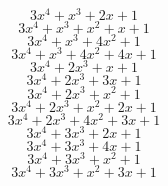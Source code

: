 \documentclass{article}
\begin{document}
\begin{dmath*}
3 x^{4}+x^{3}+2 x +1
\end{dmath*}
\vspace{-\bigskipamount}
\begin{dmath*}
3 x^{4}+x^{3}+x^{2}+x +1
\end{dmath*}
\vspace{-\bigskipamount}
\begin{dmath*}
3 x^{4}+x^{3}+4 x^{2}+1
\end{dmath*}
\vspace{-\bigskipamount}
\begin{dmath*}
3 x^{4}+x^{3}+4 x^{2}+4 x +1
\end{dmath*}
\vspace{-\bigskipamount}
\begin{dmath*}
3 x^{4}+2 x^{3}+x +1
\end{dmath*}
\vspace{-\bigskipamount}
\begin{dmath*}
3 x^{4}+2 x^{3}+3 x +1
\end{dmath*}
\vspace{-\bigskipamount}
\begin{dmath*}
3 x^{4}+2 x^{3}+x^{2}+1
\end{dmath*}
\vspace{-\bigskipamount}
\begin{dmath*}
3 x^{4}+2 x^{3}+x^{2}+2 x +1
\end{dmath*}
\vspace{-\bigskipamount}
\begin{dmath*}
3 x^{4}+2 x^{3}+4 x^{2}+3 x +1
\end{dmath*}
\vspace{-\bigskipamount}
\begin{dmath*}
3 x^{4}+3 x^{3}+2 x +1
\end{dmath*}
\vspace{-\bigskipamount}
\begin{dmath*}
3 x^{4}+3 x^{3}+4 x +1
\end{dmath*}
\vspace{-\bigskipamount}
\begin{dmath*}
3 x^{4}+3 x^{3}+x^{2}+1
\end{dmath*}
\vspace{-\bigskipamount}
\begin{dmath*}
3 x^{4}+3 x^{3}+x^{2}+3 x +1
\end{dmath*}
\end{document}
